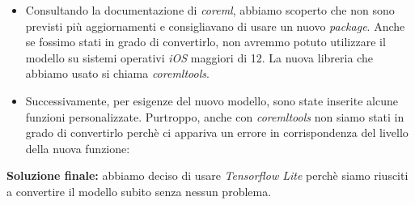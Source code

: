 \begin{itemize}
	\item Consultando la documentazione di \textit{coreml}, abbiamo scoperto che non sono previsti più aggiornamenti e consigliavano di usare un nuovo \textit{package}. Anche se fossimo stati in grado di convertirlo, non avremmo potuto utilizzare il modello su sistemi operativi \textit{iOS} maggiori di 12. La nuova libreria che abbiamo usato si chiama \textit{coremltools}.
	\vspace*{2ex}
	\vspace*{2ex}
	\item Successivamente, per esigenze del nuovo modello, sono state inserite alcune funzioni personalizzate. Purtroppo, anche con \textit{coremltools} non siamo stati in grado di convertirlo perchè ci appariva un errore in corrispondenza del livello della nuova funzione:
	\vspace*{2ex}
	\vspace*{2ex}
	
\end{itemize}
\textbf{Soluzione finale:} abbiamo deciso di usare \textit{Tensorflow Lite} perchè siamo riusciti a convertire il modello subito senza nessun problema.

